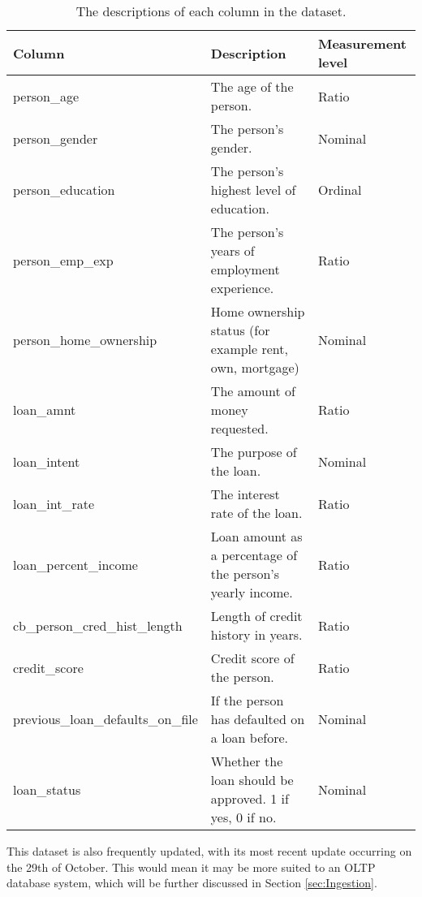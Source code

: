 \begin{table}[H]
    \centering
    \begin{tabular}{|p{}| p{}| p{} |}
        \hline
        \cellcolor{blue!25}Column & \cellcolor{blue!25}Description & \cellcolor{blue!25}Measurement level\\
            \hline
            person\_age & The age of the person. & Ratio\\
            \hline
            person\_gender & The person's gender. & Nominal\\
            \hline
            person\_education & The person's highest level of education. & Ordinal\\
            \hline
            person\_emp\_exp & The person's years of employment experience. & Ratio\\
            \hline
            person\_home\_ownership & Home ownership status (for example rent, own, mortgage)
            & Nominal\\
            \hline
            loan\_amnt & The amount of money requested. & Ratio\\
            \hline
            loan\_intent & The purpose of the loan. & Nominal\\
            \hline
            loan\_int\_rate & The interest rate of the loan. & Ratio\\
            \hline
            loan\_percent\_income & Loan amount as a percentage of the person's yearly income.
            & Ratio\\
            \hline
            cb\_person\_cred\_hist\_length & Length of credit history in years. & Ratio\\
            \hline
            credit\_score & Credit score of the person. & Ratio\\
            \hline
            previous\_loan\_defaults\_on\_file & If the person has defaulted on a loan before.
            & Nominal \\
            \hline
            loan\_status & Whether the loan should be approved. 1 if yes, 0 if no.
            & Nominal\\
            \hline
    \end{tabular}
    \caption{The descriptions of each column in the dataset.}\label{tab:Loan-Types}
\end{table}

This dataset is also frequently updated, with its most recent update occurring on the 29th of October.
This would mean it may be more suited to an OLTP database system, which will be further discussed in Section 
\ref{sec:Ingestion}.


